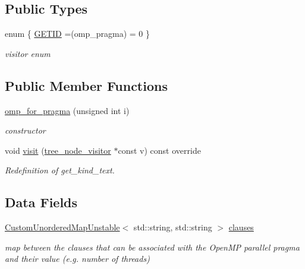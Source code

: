 \subsection*{Public Types}
\begin{DoxyCompactItemize}
\item 
enum \{ \hyperlink{structomp__for__pragma_ad3ae285036548079be8e4ce4a1059f3fa4a57d7f0d1c00a1e3ddd7ec646da5fa7}{G\+E\+T\+ID} =(omp\+\_\+pragma) = 0
 \}\begin{DoxyCompactList}\small\item\em visitor enum \end{DoxyCompactList}
\end{DoxyCompactItemize}
\subsection*{Public Member Functions}
\begin{DoxyCompactItemize}
\item 
\hyperlink{structomp__for__pragma_a396079945010b64872e201cd5c42c41b}{omp\+\_\+for\+\_\+pragma} (unsigned int i)
\begin{DoxyCompactList}\small\item\em constructor \end{DoxyCompactList}\item 
void \hyperlink{structomp__for__pragma_aaedfb731b705c0abadbc9fcb4a7bafef}{visit} (\hyperlink{classtree__node__visitor}{tree\+\_\+node\+\_\+visitor} $\ast$const v) const override
\begin{DoxyCompactList}\small\item\em Redefinition of get\+\_\+kind\+\_\+text. \end{DoxyCompactList}\end{DoxyCompactItemize}
\subsection*{Data Fields}
\begin{DoxyCompactItemize}
\item 
\hyperlink{custom__map_8hpp_a8cbaceffc09790a885ec7e9c17809c69}{Custom\+Unordered\+Map\+Unstable}$<$ std\+::string, std\+::string $>$ \hyperlink{structomp__for__pragma_a9821205024efc4880ab77fdcc80b55dc}{clauses}
\begin{DoxyCompactList}\small\item\em map between the clauses that can be associated with the Open\+MP parallel pragma and their value (e.\+g. number of threads) \end{DoxyCompactList}\end{DoxyCompactItemize}
